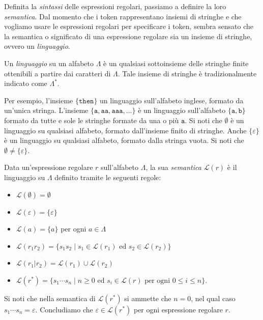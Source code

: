 Definita la \emph{sintassi} delle espressioni regolari,
passiamo a definire la loro
\emph{semantica}. Dal momento che i token rappresentano insiemi di stringhe
e che vogliamo usare le espressioni regolari per specificare i token,
sembra sensato che la semantica o significato di una espressione regolare sia
un insieme di stringhe, ovvero un \emph{linguaggio}.
%
\begin{definition}[Linguaggio]\label{def:language}
Un \emph{linguaggio} su un alfabeto $\Lambda$ \`e un qualsiasi sottoinsieme
delle stringhe finite ottenibili a partire dai caratteri di $\Lambda$.
Tale insieme di stringhe \`e tradizionalmente indicato come $\Lambda^*$.
\end{definition}
%
Per esempio, l'insieme $\{\mathtt{then}\}$ \e un linguaggio sull'alfabeto
inglese, formato da un'unica stringa. L'insieme $\{\mathtt{a},\mathtt{aa},
\mathtt{aaa},\ldots\}$ \`e un linguaggio sull'alfabeto $\{\mathtt{a},
\mathtt{b}\}$ formato da tutte e sole le stringhe formate da una o pi\`u
$\mathtt{a}$. Si noti che $\emptyset$ \`e un linguaggio su qualsiasi
alfabeto, formato dall'insieme finito di stringhe. Anche
$\{\varepsilon\}$ \`e un linguaggio su qualsiasi alfabeto, formato dalla
stringa vuota. Si noti che $\emptyset\not=\{\varepsilon\}$.
%
\begin{definition}
  \label{def:regular_language}
Data un'espressione regolare $r$ sull'alfabeto $\Lambda$, la sua
\emph{semantica} $\mathcal{L}(r)$ \`e il linguaggio su $\Lambda$ definito
tramite le seguenti regole:
%
\begin{itemize}
\item $\mathcal{L}(\emptyset)=\emptyset$
\item $\mathcal{L}(\varepsilon)=\{\varepsilon\}$
\item $\mathcal{L}(a)=\{a\}$ per ogni $a\in\Lambda$
\item $\mathcal{L}(r_1r_2)=\{s_1s_2\mid s_1\in\mathcal{L}(r_1)\text{ ed }
      s_2\in\mathcal{L}(r_2)\}$
\item $\mathcal{L}(r_1|r_2)=\mathcal{L}(r_1)\cup\mathcal{L}(r_2)$
\item $\mathcal{L}(r^*)=\{s_1\cdots s_n\mid n\ge 0\text{ ed }s_i\in
      \mathcal{L}(r)\text{ per ogni }0\le i\le n\}$.
\end{itemize}
\end{definition}
%
\noindent
Si noti che nella semantica di $\mathcal{L}(r^*)$ si ammette che
$n=0$, nel qual caso $s_1\cdots s_n=\varepsilon$. Concludiamo che
$\varepsilon\in\mathcal{L}(r^*)$ per ogni espressione regolare $r$.


